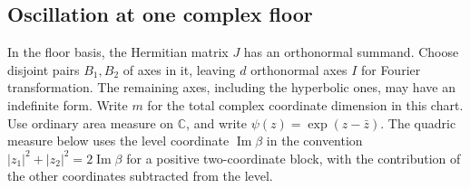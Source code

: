\subsection*{Oscillation at one complex floor}
In the floor basis, the Hermitian matrix $J$ has an orthonormal summand. Choose disjoint pairs $B_1,B_2$ of axes in it, leaving $d$ orthonormal axes $I$ for Fourier transformation. The remaining axes, including the hyperbolic ones, may have an indefinite form. Write $m$ for the total complex coordinate dimension in this chart. Use ordinary area measure on $\mathbb C$, and write $\psi(z)=\exp(z-\bar z)$.
The quadric measure below uses the level coordinate $\operatorname{Im}\beta$ in the convention $|z_1|^2+|z_2|^2=2\operatorname{Im}\beta$ for a positive two-coordinate block, with the contribution of the other coordinates subtracted from the level.

